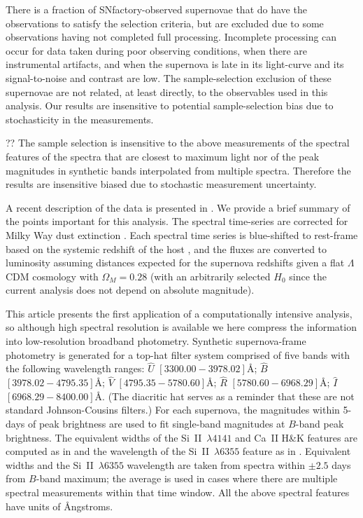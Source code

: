 \documentclass[trackchanges]{aastex62}   	%
\begin{document}
{There is a fraction of SNfactory-observed supernovae that do have the
observations to satisfy the selection criteria, but are excluded due to some observations
having not completed full processing.  Incomplete processing can occur for data taken during poor
observing conditions, when there are instrumental artifacts, and when the supernova is late in its
light-curve and its signal-to-noise and contrast are low.  The sample-selection exclusion of these supernovae are not related,
at least directly, to the observables used in this analysis.  Our results are insensitive to potential sample-selection
bias due to stochasticity in the measurements.

??
The sample selection is insensitive to the above measurements of the spectral features of the spectra that are
closest to maximum light nor of the  peak magnitudes in synthetic
bands interpolated from multiple spectra.
Therefore the results are insensitive
biased due to stochastic measurement uncertainty.

}


A recent description of the data is presented in \citet{2015ApJ...815...58F}.
We provide a brief summary of the points important for this analysis.
The spectral time-series  are corrected for Milky Way dust
extinction \citep{1989ApJ...345..245C,1998ApJ...500..525S}.  
Each spectral time series is
blue-shifted to rest-frame
based on the systemic redshift of the host \citep[c.f.][]{2013ApJ...770..107C}, and the fluxes are converted to luminosity assuming
distances expected for the supernova redshifts given a flat
$\Lambda$CDM cosmology with $\Omega_M = 0.28$ (with an arbitrarily selected
$H_0$ since the current analysis does not depend on absolute magnitude).

This article presents the first application of a computationally intensive analysis, so although  high spectral resolution
is available we here compress the information into low-resolution broadband photometry. 
Synthetic supernova-frame photometry is generated for a top-hat filter system
comprised of five 
bands with the following wavelength ranges: ${\hat{U}}$ $[3300.00 - 3978.02]$\AA;
${\hat{B}}$ $[3978.02-4795.35]$\AA;
$\hat{V}$ $[4795.35-5780.60]$\AA;
$\hat{R}$ $[5780.60-6968.29]$\AA;
$\hat{I}$ $[6968.29-8400.00]$\AA.
(The diacritic hat serves as a reminder that these are not standard Johnson-Cousins filters.)
For each supernova, the magnitudes within 5-days of peak brightness are used to fit single-band magnitudes
at $B$-band peak brightness.
The equivalent widths of the Si~II~$\lambda 4141$ and Ca~II H\&K features are computed as
in \citet{2008A&A...477..717B} and the 
wavelength of the Si~II~$\lambda 6355$ feature
as in \citet{chotard:thesis, 2017Chotard}.
Equivalent widths and the
Si~II~$\lambda 6355$ wavelength are taken from spectra  within $\pm 2.5$ days from $B$-band maximum;
the average is used  in cases where there are multiple spectral measurements within that time window.
All the above spectral features have units of \AA ngstroms.
\end{document}

